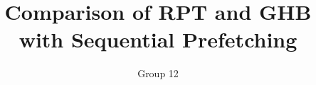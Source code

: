 \documentclass[journal]{IEEEtran}
\begin{document}
\title{Comparison of RPT and GHB with Sequential Prefetching}


\author{Group 12}

\maketitle










%
%




\end{document}

